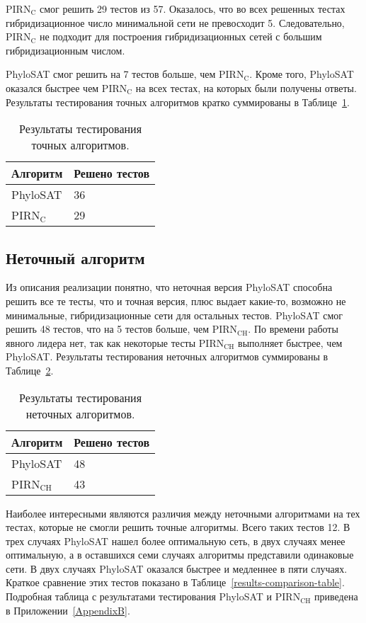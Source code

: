 PIRN$\mathrm{_C}$ смог решить 29 тестов из 57.
Оказалось, что во всех решенных тестах гибридизационное число минимальной сети не превосходит 5.
Следовательно, PIRN$\mathrm{_C}$ не подходит для построения гибридизационных сетей с большим гибридизационным числом.

PhyloSAT смог решить на 7 тестов больше, чем PIRN$\mathrm{_C}$.
Кроме того, PhyloSAT оказался быстрее чем PIRN$\mathrm{_C}$ на всех тестах, на которых были получены ответы.
Результаты тестирования точных алгоритмов кратко суммированы в Таблице~\ref{exact-results-table}.

\begin{table}[t]
\caption{Результаты тестирования точных алгоритмов.}
\centering
\begin{tabular}{l | l}
	Алгоритм & Решено тестов \\
	\hline
	PhyloSAT & 36 \\
	PIRN$\mathrm{_C}$ & 29 \\
\end{tabular}
\label{exact-results-table}
\end{table}

\subsection{Неточный алгоритм}

Из описания реализации понятно, что неточная версия PhyloSAT способна решить все те тесты, что и точная версия, плюс выдает какие-то, возможно не минимальные, гибридизационные сети для остальных тестов.
PhyloSAT смог решить 48 тестов, что на 5 тестов больше, чем PIRN$\mathrm{_{CH}}$.
По времени работы явного лидера нет, так как некоторые тесты PIRN$\mathrm{_{CH}}$ выполняет быстрее, чем PhyloSAT.
Результаты тестирования неточных алгоритмов суммированы в Таблице~\ref{heuristic-results-table}.

\begin{table}[t]
\caption{Результаты тестирования неточных алгоритмов.}
\centering
\begin{tabular}{l | l}
	Алгоритм & Решено тестов \\
	\hline
	PhyloSAT & 48 \\
	PIRN$\mathrm{_{CH}}$ & 43 \\
\end{tabular}
\label{heuristic-results-table}
\end{table}

Наиболее интересными являются различия между неточными алгоритмами на тех тестах, которые не смогли решить точные алгоритмы.
Всего таких тестов 12.
В трех случаях PhyloSAT нашел более оптимальную сеть, в двух случаях менее оптимальную, а в оставшихся семи случаях алгоритмы представили одинаковые сети.
В двух случаях PhyloSAT оказался быстрее и медленнее в пяти случаях.
Краткое сравнение этих тестов показано в Таблице~\ref{results-comparison-table}.
Подробная таблица с результатами тестирования PhyloSAT и PIRN$\mathrm{_{CH}}$ приведена в Приложении~\ref{AppendixB}.

